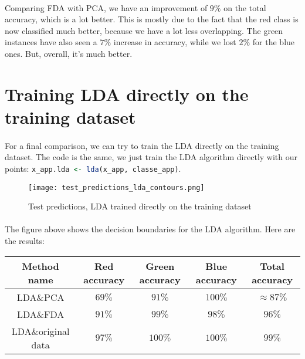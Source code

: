 \paragraph{}
Comparing FDA with PCA, we have an improvement of $9\%$ on the total accuracy, which is a lot better.
This is mostly due to the fact that the red class is now classified much better, because we have a lot less overlapping.
The green instances have also seen a $7\%$ increase in accuracy, while we lost $2\%$ for the blue ones.
But, overall, it's much better.


\section{Training LDA directly on the training dataset}
\paragraph{}
For a final comparison, we can try to train the LDA directly on the training dataset.
The code is the same, we just train the LDA algorithm directly with our points: \lstinline[language=R]!x_app.lda <- lda(x_app, classe_app)!.

\begin{figure}[H]
    \centering
    \texttt{[image: test\_predictions\_lda\_contours.png]}
    \caption{Test predictions, LDA trained directly on the training dataset}
\end{figure}

\paragraph{}
The figure above shows the decision boundaries for the LDA algorithm.
Here are the results:

\begin{center}
    \begin{tabular}{ |c|c|c|c|c| }
        \hline
        Method name & Red accuracy & Green accuracy & Blue accuracy & Total accuracy \\
        \hline
        LDA\&PCA & $69\%$ & $91\%$ & $100\%$ & $\approx 87\%$ \\
        \hline
        LDA\&FDA & $91\%$ & $99\%$ & $98\%$ & $96\%$ \\
        \hline
        LDA\&original data & $97\%$ & $100\%$ & $100\%$ & $99\%$ \\
        \hline
    \end{tabular}
\end{center}

